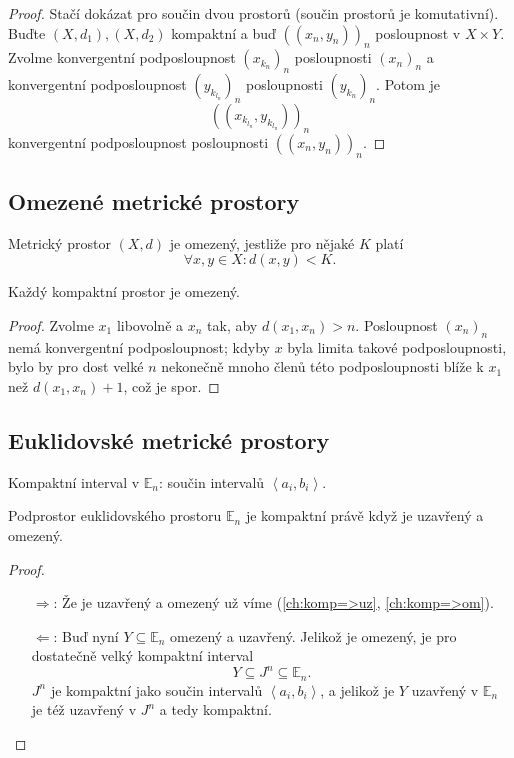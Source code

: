 \documentclass[../main.tex]{subfiles}
\begin{document}
\begin{proof}
	Stačí dokázat pro součin dvou prostorů (součin prostorů je komutativní).
	Buďte $(X,d_1), (X, d_2)$ kompaktní a buď $((x_n,y_n))_n$ posloupnost v $X \times Y$. 
	Zvolme konvergentní podposloupnost $(x_{k_n})_n$ posloupnosti $(x_n)_n$ a konvergentní podposloupnost $(y_{k_{l_n}})_n$ posloupnosti $(y_{k_n})_n$.
	Potom je 
	\[((x_{k_{l_n}},y_{k_{l_n}}))_n\]
	konvergentní podposloupnost posloupnosti $((x_n,y_n))_n$.
\end{proof}

\subsection{Omezené metrické prostory}

\begin{definition}
	Metrický prostor $(X,d)$ je omezený, jestliže pro nějaké $K$ platí
	\[\forall x,y \in X : d(x,y) < K.\]
\end{definition}

\begin{lemma}\label{ch:komp=>om}
	Každý kompaktní prostor je omezený.
\end{lemma}

\begin{proof}
	Zvolme $x_1$ libovolně a $x_n$ tak, aby $d(x_1,x_n) > n$. Posloupnost $(x_n)_n$ nemá konvergentní podposloupnost; kdyby $x$
	byla limita takové podposloupnosti, bylo by pro dost velké $n$ nekonečně mnoho členů této podposloupnosti blíže k $x_1$ než $d(x_1,x_n)+1$, což je spor.
\end{proof}

\subsection{Euklidovské metrické prostory}
\begin{remark}
	Kompaktní interval v $\mathbb{E}_n$: součin intervalů $\left<a_i,b_i\right>$.
\end{remark}

\begin{theorem}
	Podprostor euklidovského prostoru $\mathbb{E}_n$ je kompaktní právě když je uzavřený a omezený.
\end{theorem}

\begin{proof}
	\begin{enumerate}
		\item[$\Rightarrow$:] Že je uzavřený a omezený už víme (\ref{ch:komp=>uz}, \ref{ch:komp=>om}).
		\item[$\Leftarrow$:] Buď nyní $Y \subseteq \mathbb{E}_n$ omezený a uzavřený. Jelikož je omezený, je pro dostatečně velký kompaktní interval
	    \[Y \subseteq J^n \subseteq \mathbb{E}_n.\]
	    $J^n$ je kompaktní jako součin intervalů $\left<a_i,b_i\right>$, a jelikož je $Y$ uzavřený v $\mathbb{E}_n$ je též uzavřený
	    v $J^n$ a tedy kompaktní.
	\end{enumerate}
\end{proof}
\end{document}
